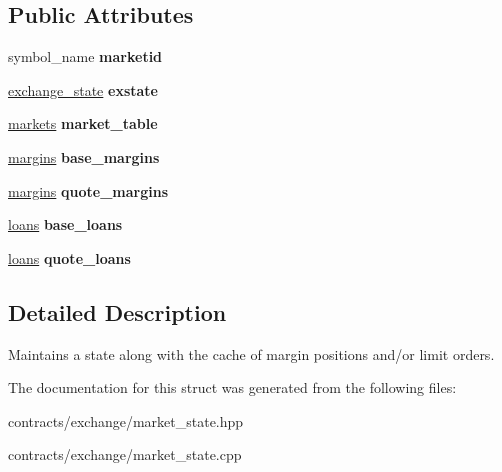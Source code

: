\subsection*{Public Attributes}
\begin{DoxyCompactItemize}
\item 
\mbox{\label{structaacio_1_1market__state_a714c0eaa5701bc771c27bb4b6adbf5be}} 
symbol\+\_\+name {\bfseries marketid}
\item 
\mbox{\label{structaacio_1_1market__state_a32b7f8275abb3c8bc7785f166749a8d7}} 
\mbox{\hyperlink{structaacio_1_1exchange__state}{exchange\+\_\+state}} {\bfseries exstate}
\item 
\mbox{\label{structaacio_1_1market__state_ab418f4d867f6a7e67d31909aa2358f0c}} 
\mbox{\hyperlink{classaacio_1_1multi__index}{markets}} {\bfseries market\+\_\+table}
\item 
\mbox{\label{structaacio_1_1market__state_a034f47da6b8738a5ae51ba3f18eaf35c}} 
\mbox{\hyperlink{classaacio_1_1multi__index}{margins}} {\bfseries base\+\_\+margins}
\item 
\mbox{\label{structaacio_1_1market__state_af53dc4c3f989140545a0d7cd2b3fbbed}} 
\mbox{\hyperlink{classaacio_1_1multi__index}{margins}} {\bfseries quote\+\_\+margins}
\item 
\mbox{\label{structaacio_1_1market__state_a5b886a9bf7e95aa6a1ee4b94f69af0fd}} 
\mbox{\hyperlink{classaacio_1_1multi__index}{loans}} {\bfseries base\+\_\+loans}
\item 
\mbox{\label{structaacio_1_1market__state_acd2d5d06be8144e40237f687c77cbecb}} 
\mbox{\hyperlink{classaacio_1_1multi__index}{loans}} {\bfseries quote\+\_\+loans}
\end{DoxyCompactItemize}


\subsection{Detailed Description}
Maintains a state along with the cache of margin positions and/or limit orders. 

The documentation for this struct was generated from the following files\+:\begin{DoxyCompactItemize}
\item 
contracts/exchange/market\+\_\+state.\+hpp\item 
contracts/exchange/market\+\_\+state.\+cpp\end{DoxyCompactItemize}
